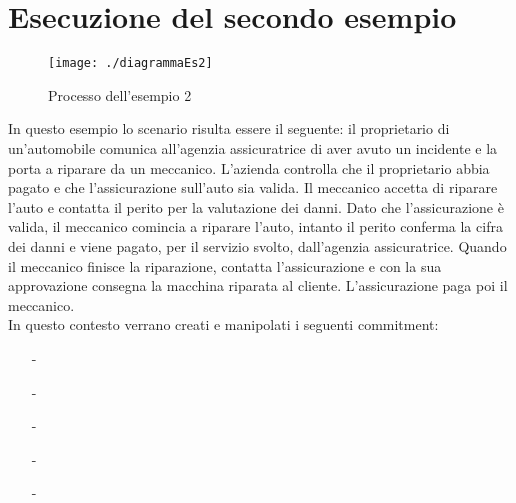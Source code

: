 \documentclass[a4paper,12pt]{report}
\begin{document}
\section{Esecuzione del secondo esempio}
\begin{figure}[h]
    \texttt{[image: ./diagrammaEs2]}
    \caption{Processo dell'esempio 2}
    \label{diagramma1}
\end{figure}
In questo esempio lo scenario risulta essere il seguente: il proprietario di un'automobile comunica all'agenzia assicuratrice di aver avuto un incidente e la porta a riparare da un meccanico. L'azienda controlla che il proprietario abbia pagato e che l'assicurazione sull'auto sia valida. Il meccanico accetta di riparare l'auto e contatta il perito per la valutazione dei danni. Dato che l'assicurazione è valida, il meccanico comincia a riparare l'auto, intanto il perito conferma la cifra dei danni e viene pagato, per il servizio svolto, dall'agenzia assicuratrice. Quando il meccanico finisce la riparazione, contatta l'assicurazione e con la sua approvazione consegna la macchina riparata al cliente. L'assicurazione paga poi il meccanico.\\
In questo contesto verrano creati e manipolati i seguenti commitment:
\begin{enumerate}
    \item[-] \\
    \item[-] 
    \item[-] \\
    \item[-] \\
    \scalebox{0.90}{$\ \ \ \ \ \ \ \ \ \ \ \ \ \ \ \ car-repaired, \emptyset, +8)$}
    \item[-] 
\end{enumerate}
\end{document}
